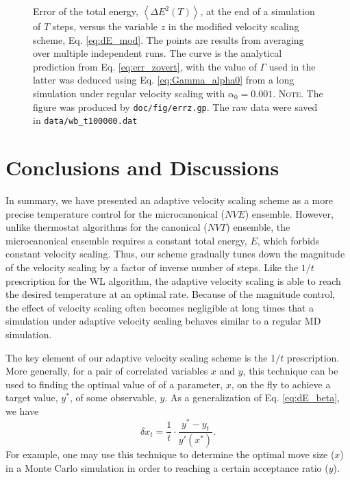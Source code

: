 \documentclass[preprint]{revtex4-1}
\newcommand{\note}[1]{{\color{DarkGreen}\footnotesize \textsc{Note.} #1}}
\begin{document}
\begin{figure}[h]
\begin{center}
  \caption{
    \label{fig:errz}
    Error of the total energy,
    $\left\langle \Delta E^2(T) \right\rangle$,
    at the end of a simulation of $T$ steps,
    versus the variable $z$
    in the modified velocity scaling scheme,
    Eq. \eqref{eq:dE_mod}.
    The points are results from averaging over
    multiple independent runs.
    The curve is the analytical prediction from
    Eq. \eqref{eq:err_zovert},
    with the value of $\Gamma$ used in the latter was deduced
    using Eq. \eqref{eq:Gamma_alpha0} from
    a long simulation under regular velocity scaling
    with $\alpha_0 = 0.001$.
    \note{The figure was produced by \texttt{doc/fig/errz.gp}.
      The raw data were saved in \texttt{data/wb\_t100000.dat}
    }%
  }
\end{center}
\end{figure}




\section{\label{sec:conclusion}
Conclusions and Discussions}



In summary, we have presented an adaptive velocity scaling scheme
as a more precise temperature control for the microcanonical ($NVE$) ensemble.
%
However, unlike thermostat algorithms for the canonical ($NVT$) ensemble,
the microcanonical ensemble requires a constant total energy, $E$,
which forbids constant velocity scaling.
%
Thus, our scheme gradually tunes down the magnitude of the velocity scaling
by a factor of inverse number of steps.
%
Like the $1/t$ prescription for the WL algorithm,
the adaptive velocity scaling is able to reach
the desired temperature at an optimal rate.
%
Because of the magnitude control,
the effect of velocity scaling often becomes negligible
at long times that
a simulation under adaptive velocity scaling
behaves similar to a regular MD simulation.

The key element of our adaptive velocity scaling scheme
is the $1/t$ prescription. %
%
More generally, for a pair of correlated variables $x$ and $y$,
this technique can be used to finding the optimal value of
of a parameter, $x$, on the fly
to achieve a target value, $y^*$, of some observable, $y$.
%
As a generalization of Eq. \eqref{eq:dE_beta},
we have
$$
\delta x_t = \frac 1 t
\cdot
\frac{ y^* - y_t }
     { y'(x^*) }
.
$$
%
For example, one may use this technique
to determine the optimal move size ($x$)
in a Monte Carlo simulation
in order to reaching a certain acceptance ratio ($y$).
\end{document}
